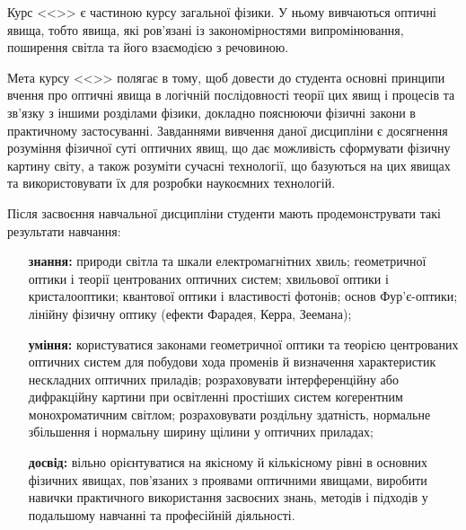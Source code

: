 \documentclass{Syllabus}
\begin{document}
Курс <<\discipline>> є частиною курсу загальної фізики. У ньому вивчаються оптичні явища, тобто явища, які ров'язані із закономірностями випромінювання, поширення світла та його взаємодією з речовиною.

Мета курсу <<\discipline>> полягає в тому, щоб довести до студента основні принципи вчення про оптичні явища в логічній послідовності теорії цих явищ і процесів та зв'язку з іншими розділами фізики, докладно пояснюючи фізичні закони в практичному застосуванні. Завданнями вивчення даної дисципліни є досягнення розуміння фізичної суті оптичних явищ, що дає можливість сформувати фізичну картину світу, а також розуміти сучасні технології, що базуються на цих явищах та використовувати їх для розробки наукоємних технологій.


Після засвоєння навчальної дисципліни студенти мають продемонструвати такі результати навчання:

\begin{enumerate}
    \item[\bfseries знання:] природи світла та шкали електромагнітних хвиль; геометричної оптики і теорії центрованих оптичних систем; хвильової оптики і кристалооптики; квантової оптики і властивості фотонів; основ Фур'є-оптики; лінійну фізичну оптику (ефекти Фарадея, Керра, Зеемана);
    \item[\bfseries уміння:] користуватися законами геометричної оптики та теорією центрованих оптичних систем для побудови хода променів й визначення характеристик нескладних оптичних приладів; розраховувати інтерференційну або дифракційну картини при освітленні простіших систем когерентним монохроматичним світлом; розраховувати роздільну здатність, нормальне збільшення і нормальну ширину щілини у оптичних приладах;
    \item[\bfseries досвід:] вільно орієнтуватися на якісному й кількісному рівні в основних фізичних явищах, пов'язаних з проявами оптичними явищами, виробити навички практичного використання засвоєних знань, методів і підходів у подальшому навчанні та професійній діяльності.
\end{enumerate}
\end{document}
